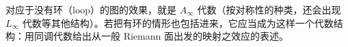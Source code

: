 
对应于没有环（loop）的图的效果，就是 $A_\infty$ 代数（按对称性的种类，还会出现 $L_\infty$ 代数等其他结构）。若把有环的情形也包括进来，它应当成为这样一个代数结构：用同调代数给出从一般 Riemann 面出发的映射之效应的表述。


\renewcommand{\thesection}{\Roman{section}}
